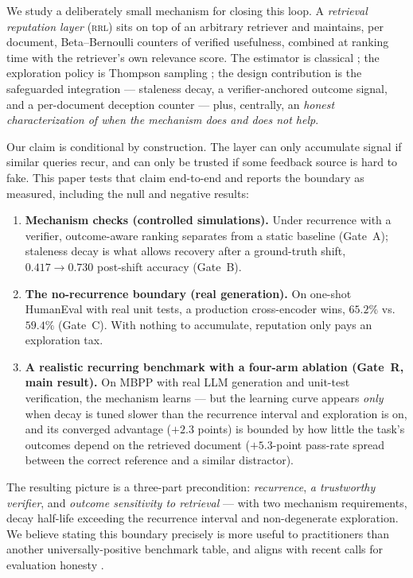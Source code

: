 \documentclass[11pt]{article}
\newcommand{\rrl}{\textsc{rrl}}
\begin{document}
We study a deliberately small mechanism for closing this loop. A
\emph{retrieval reputation layer} (\rrl{}) sits on top of an arbitrary
retriever and maintains, per document, Beta--Bernoulli counters of verified
usefulness, combined at ranking time with the retriever's own relevance score.
The estimator is classical \citep{josang2002beta}; the exploration policy is
Thompson sampling \citep{chapelle2011empirical}; the design contribution is
the safeguarded integration --- staleness decay, a verifier-anchored outcome
signal, and a per-document deception counter --- plus, centrally, an
\emph{honest characterization of when the mechanism does and does not help}.

Our claim is conditional by construction. The layer can only accumulate
signal if similar queries recur, and can only be trusted if some feedback
source is hard to fake. This paper tests that claim end-to-end and reports
the boundary as measured, including the null and negative results:

\begin{enumerate}
  \item \textbf{Mechanism checks (controlled simulations).} Under recurrence
  with a verifier, outcome-aware ranking separates from a static baseline
  (Gate~A); staleness decay is what allows recovery after a ground-truth
  shift, $0.417 \rightarrow 0.730$ post-shift accuracy (Gate~B).
  \item \textbf{The no-recurrence boundary (real generation).} On one-shot
  HumanEval with real unit tests, a production cross-encoder wins,
  $65.2\%$ vs.\ $59.4\%$ (Gate~C). With nothing to accumulate, reputation
  only pays an exploration tax.
  \item \textbf{A realistic recurring benchmark with a four-arm ablation
  (Gate~R, main result).} On MBPP with real LLM generation and unit-test
  verification, the mechanism learns --- but the learning curve appears
  \emph{only} when decay is tuned slower than the recurrence interval and
  exploration is on, and its converged advantage ($+2.3$ points) is bounded
  by how little the task's outcomes depend on the retrieved document
  ($+5.3$-point pass-rate spread between the correct reference and a
  similar distractor).
\end{enumerate}

The resulting picture is a three-part precondition: \emph{recurrence},
\emph{a trustworthy verifier}, and \emph{outcome sensitivity to retrieval} ---
with two mechanism requirements, decay half-life exceeding the recurrence
interval and non-degenerate exploration. We believe stating this boundary
precisely is more useful to practitioners than another universally-positive
benchmark table, and aligns with recent calls for evaluation honesty
\citep{benchbroken2025}.
\end{document}
